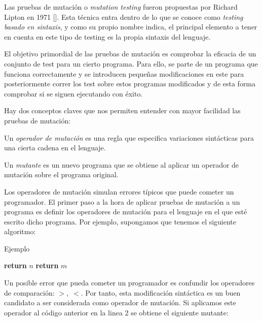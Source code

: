 Las pruebas de mutación o \textit{mutation testing} fueron propuestas por Richard Lipton en 1971 [\cite{lipton1971fault}]. Esta técnica entra dentro de lo que se conoce como \textit{testing basado en sintaxis}, y como su propio nombre indica, el principal elemento a tener en cuenta en este tipo de testing es la propia sintaxis del lenguaje.

El objetivo primordial de las pruebas de mutación es comprobar la eficacia de un conjunto de test para un cierto programa. Para ello, se parte de un programa que funciona correctamente y se introducen pequeñas modificaciones en este para posteriormente correr los test sobre estos programas modificados y de esta forma comprobar si se siguen ejecutando con éxito.

Hay dos conceptos claves que nos permiten entender con mayor facilidad las pruebas de mutación:
\begin{definition}
Un \emph{operador de mutación} es una regla que especifica variaciones sintácticas para una cierta cadena en el lenguaje.
\end{definition}

\begin{definition}
Un \emph{mutante} es un nuevo programa que se obtiene al aplicar un operador de mutación sobre el programa original.
\end{definition}

Los operadores de mutación simulan errores típicos que puede cometer un programador. El primer paso a la hora de aplicar pruebas de mutación a un programa es definir los operadores de mutación para el lenguaje en el que esté escrito dicho programa. Por ejemplo, supongamos que tenemos el siguiente algoritmo:
\clearpage 

\begin{algorithm}
\caption{Ejemplo}
\begin{algorithmic}[1]
    \State  \textbf{return} $n$
\Else
    \State \textbf{return} $m$
\EndIf
\EndProcedure
\end{algorithmic}
\end{algorithm}


Un posible error que pueda cometer un programador es confundir los operadores de comparación: $>,\; <$. Por tanto, esta modificación sintáctica es un buen candidato a ser considerada como operador de mutación. Si aplicamos este operador al código anterior en la linea 2 se obtiene el siguiente mutante:

